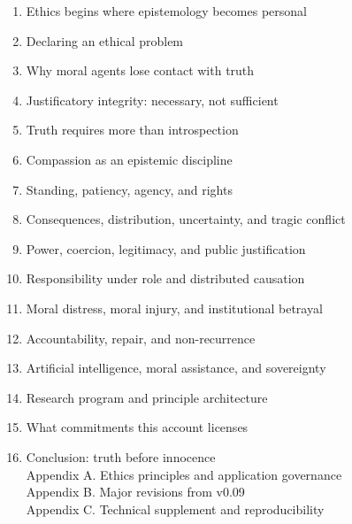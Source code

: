 \documentclass[
  11pt,
]{article}
\providecommand{\tightlist}{%
  \setlength{\itemsep}{0pt}\setlength{\parskip}{0pt}}
\begin{document}
\begin{enumerate}
\def\labelenumi{\arabic{enumi}.}
\tightlist
\item
  Ethics begins where epistemology becomes personal\\
\item
  Declaring an ethical problem\\
\item
  Why moral agents lose contact with truth\\
\item
  Justificatory integrity: necessary, not sufficient\\
\item
  Truth requires more than introspection\\
\item
  Compassion as an epistemic discipline\\
\item
  Standing, patiency, agency, and rights\\
\item
  Consequences, distribution, uncertainty, and tragic conflict\\
\item
  Power, coercion, legitimacy, and public justification\\
\item
  Responsibility under role and distributed causation\\
\item
  Moral distress, moral injury, and institutional betrayal\\
\item
  Accountability, repair, and non-recurrence\\
\item
  Artificial intelligence, moral assistance, and sovereignty\\
\item
  Research program and principle architecture\\
\item
  What commitments this account licenses\\
\item
  Conclusion: truth before innocence\\
  Appendix A. Ethics principles and application governance\\
  Appendix B. Major revisions from v0.09\\
  Appendix C. Technical supplement and reproducibility
\end{enumerate}
\end{document}
